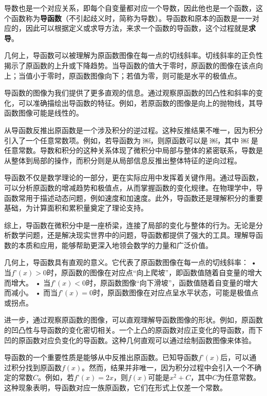 导数也是一个对应关系，即每个自变量都对应一个导数，因此他也是一个函数，这个函数称为\textbf{导函数}（不引起歧义时，简称为导数）。导函数和原本的函数是一一对应的，因此可以根据定义或求导方法，来求一个函数的导函数，这个过程就是\textbf{求导}。



几何上，导函数可以被理解为原函数图像在每一点的切线斜率。切线斜率的正负性揭示了原函数的上升或下降趋势。当导函数的值大于零时，原函数的图像在该点向上；当值小于零时，原函数图像向下；若值为零，则可能是水平的极值点。

导函数的图像为我们提供了更多直观的信息。通过观察原函数的凹凸性和斜率的变化，可以准确描绘出导函数的特征。例如，若原函数的图像是向上的抛物线，其导函数图像可能是线性的。

从导函数反推出原函数是一个涉及积分的逆过程。这种反推结果不唯一，因为积分引入了一个任意常数项。例如，若导函数为 ￼，则原函数可以是 ￼，其中 ￼ 是任意常数。导数和积分的这种关系体现了微积分中局部与整体的紧密联系，导数是从整体到局部的操作，而积分则是从局部信息反推出整体特征的逆向过程。

导函数不仅是数学理论的一部分，更在实际应用中发挥着关键作用。通过导函数，可以分析原函数的增减趋势和极值点，从而掌握函数的变化规律。在物理学中，导函数常用于描述动态问题，例如速度和加速度。此外，导函数还是理解积分的重要基础，为计算面积和累积量奠定了理论支持。

综上，导函数在微积分中是一座桥梁，连接了局部的变化与整体的行为。无论是分析数学问题，还是解决现实世界中的问题，导函数都提供了强大的工具。理解导函数的本质和应用，能够帮助更深入地领会数学的力量和广泛价值。



几何上，导函数具有直观的意义。它代表了原函数图像在每一点的切线斜率：
	•	当$f’(x) > 0$时，原函数的图像在对应点“向上爬坡”，即函数值随着自变量的增大而增大。
	•	当$f’(x) < 0$时，原函数图像“向下滑坡”，函数值随着自变量的增大而减小。
	•	而当$f’(x) = 0$时，原函数图像在对应点呈水平状态，可能是极值点或拐点。

进一步，通过观察原函数的图像，可以直观理解导函数图像的形状。例如，原函数的凹凸性与导函数的变化密切相关。一个上凸的原函数对应正变化的导函数，而下凹的原函数对应负变化的导函数。这种几何直观可以通过绘制函数图像来体验。

导函数的一个重要性质是能够从中反推出原函数。已知导函数$f’(x)$后，可以通过积分找到原函数$f(x)$。然而，结果并非唯一，因为积分过程中会引入一个不确定的常数$C$。例如，若$f’(x) = 2x$，则$f(x)$可能是$x^2 + C$，其中$C$为任意常数。这种现象表明，导函数对应一族原函数，它们在形式上仅差一个常数。

